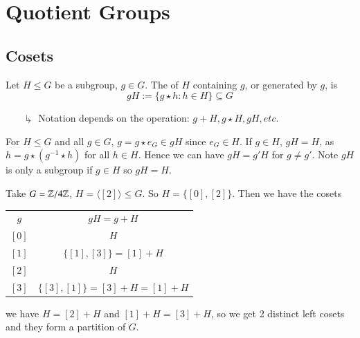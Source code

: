 \documentclass[12pt, a4paper, oneside, openright, titlepage]{book}
\begin{document}
\chapter{\textsection\textsection Quotient Groups}

\section{\textsection Cosets}

\begin{defn}
        Let $H \leq G$ be a subgroup, $g \in G$. The  of $H$ containing $g$, or generated by $g$, is \begin{equation}
                gH := \{g\star h:h\in H\}\subseteq G
        \end{equation}
\end{defn}
\begin{enumerate}
        \item[$\drsh$] Notation depends on the operation: $g+H, g\star H, gH, etc.$
\end{enumerate}

\begin{note}
        For $H \leq G$ and all $g \in G$, $g = g\star e_G \in gH$ since $e_G \in H$. If $g \in H$, $gH = H$, as $h = g \star (g^{-1} \star h)$ for all $h \in H$. Hence we can have $gH = g'H$ for $g \neq g'$. Note $gH$ is only a subgroup if $g \in H$ so $gH = H$.
\end{note}

\begin{eg}
        Take $G = \mathbb Z/4\mathbb Z$, $H = \langle [2]\rangle \leq G$. So $H = \{[0], [2]\}$. Then we have the cosets \begin{table}[H]
                \centering
                \begin{tabular}{cc}
                        $g$ & $gH = g+H$ \\
                        $[0]$ & $H$ \\
                        $[1]$ & $\{ [1],[3] \} = [1] +H$\\
                        $[2]$ & $H$ \\
                        $[3]$ & $\{[3], [1]\} = [3]+H = [1] +H$
                \end{tabular}
        \end{table}
        we have $H = [2]+H$ and $[1]+H = [3]+H$, so we get 2 distinct left cosets and they form a partition of $G$.
\end{eg}
\end{document}

